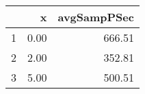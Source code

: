 \begin{table}[h]
\centering
\begin{tabular}{rrr}
  \hline
 & x & avgSampPSec \\ 
  \hline
1 & 0.00 & 666.51 \\ 
   \hline
2 & 2.00 & 352.81 \\ 
   \hline
3 & 5.00 & 500.51 \\ 
   \hline
\end{tabular}
\end{table}
